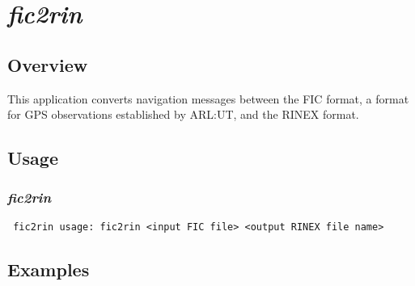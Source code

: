 %
%

\section{\emph{fic2rin}}
\subsection{Overview}

This application converts navigation messages between the FIC format, a format for GPS observations established by ARL:UT, and the RINEX format.

\subsection{Usage}
\subsubsection{\emph{fic2rin}}
\begin{\outputsize}
\begin{verbatim}
 fic2rin usage: fic2rin <input FIC file> <output RINEX file name>
\end{verbatim}
\end{\outputsize}

\subsection{Examples}


